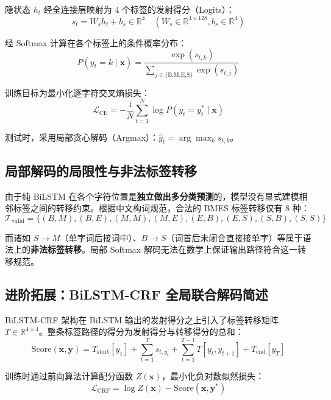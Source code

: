 \documentclass[11pt,a4paper]{ctexart}
\begin{document}
隐状态 $h_t$ 经全连接层映射为 4 个标签的发射得分（Logits）：
\begin{equation}
    s_t = W_s h_t + b_s \in \mathbb{R}^4 \quad (W_s \in \mathbb{R}^{4 \times 128}, b_s \in \mathbb{R}^4)
\end{equation}

经 Softmax 计算在各个标签上的条件概率分布：
\begin{equation}
    P(y_t = k \mid \boldsymbol{x}) = \frac{\exp(s_{t, k})}{\sum_{j \in \{\text{B,M,E,S}\}} \exp(s_{t, j})}
\end{equation}

训练目标为最小化逐字符交叉熵损失：
\begin{equation}
    \mathcal{L}_{\text{CE}} = - \frac{1}{N} \sum_{t=1}^N \log P(y_t = y_t^* \mid \boldsymbol{x})
\end{equation}

测试时，采用局部贪心解码（Argmax）：$\hat{y}_t = \arg\max_{k} s_{t, k}$。

\subsection{局部解码的局限性与非法标签转移}

由于纯 BiLSTM 在各个字符位置是\textbf{独立做出多分类预测}的，模型没有显式建模相邻标签之间的转移约束。根据中文构词规范，合法的 BMES 标签转移仅有 8 种：
\begin{equation}
    \mathcal{T}_{\text{valid}} = \{ (B, M), (B, E), (M, M), (M, E), (E, B), (E, S), (S, B), (S, S) \}
\end{equation}

而诸如 $S \to M$（单字词后接词中）、$B \to S$（词首后未闭合直接接单字）等属于语法上的\textbf{非法标签转移}。局部 Softmax 解码无法在数学上保证输出路径符合这一转移规范。

\subsection{进阶拓展：BiLSTM-CRF 全局联合解码简述}

BiLSTM-CRF 架构在 BiLSTM 输出的发射得分之上引入了标签转移矩阵 $T \in \mathbb{R}^{4 \times 4}$。整条标签路径的得分为发射得分与转移得分的总和：
\begin{equation}
    \text{Score}(\boldsymbol{x}, \boldsymbol{y}) = T_{\text{start}}[y_1] + \sum_{t=1}^T s_{t, y_t} + \sum_{t=1}^{T-1} T[y_t, y_{t+1}] + T_{\text{end}}[y_T]
\end{equation}

训练时通过前向算法计算配分函数 $Z(\boldsymbol{x})$，最小化负对数似然损失：
\begin{equation}
    \mathcal{L}_{\text{CRF}} = \log Z(\boldsymbol{x}) - \text{Score}(\boldsymbol{x}, \boldsymbol{y}^*)
\end{equation}
\end{document}
